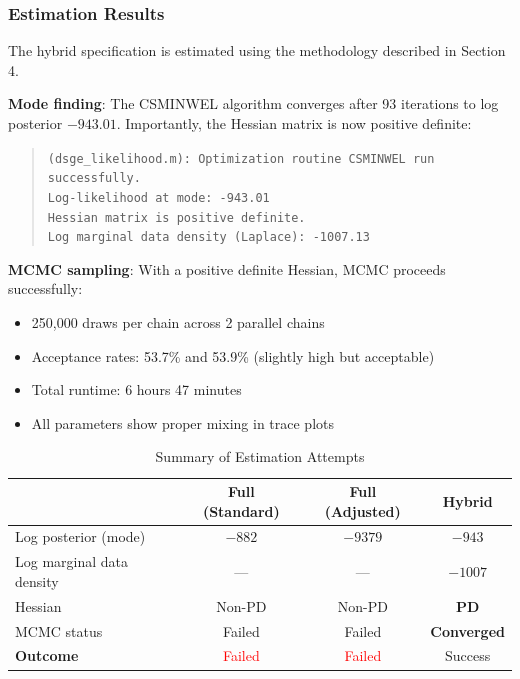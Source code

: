 \documentclass[12pt]{article}
\begin{document}
\subsubsection{Estimation Results}

The hybrid specification is estimated using the methodology described in Section 4.

\textbf{Mode finding}: The CSMINWEL algorithm converges after 93 iterations to log posterior $-943.01$. Importantly, the Hessian matrix is now positive definite:

\begin{quote}
\texttt{(dsge\_likelihood.m): Optimization routine CSMINWEL run successfully.}\\
\texttt{Log-likelihood at mode: -943.01}\\
\texttt{Hessian matrix is positive definite.}\\
\texttt{Log marginal data density (Laplace): -1007.13}
\end{quote}

\textbf{MCMC sampling}: With a positive definite Hessian, MCMC proceeds successfully:
\begin{itemize}
    \item 250,000 draws per chain across 2 parallel chains
    \item Acceptance rates: 53.7\% and 53.9\% (slightly high but acceptable)
    \item Total runtime: 6 hours 47 minutes
    \item All parameters show proper mixing in trace plots
\end{itemize}

\begin{table}[H]
\centering
\caption{Summary of Estimation Attempts}
\label{tab:attempts}
\begin{tabular}{lccc}
\toprule
& Full (Standard) & Full (Adjusted) & Hybrid \\
\midrule
Log posterior (mode) & $-882$ & $-9379$ & $-943$ \\
Log marginal data density & --- & --- & $-1007$ \\
Hessian & Non-PD & Non-PD & \textbf{PD} \\
MCMC status & Failed & Failed & \textbf{Converged} \\
\midrule
\textbf{Outcome} & \textcolor{red}{Failed} & \textcolor{red}{Failed} & \textcolor{green!50!black}{Success} \\
\bottomrule
\end{tabular}
\end{table}
\end{document}
